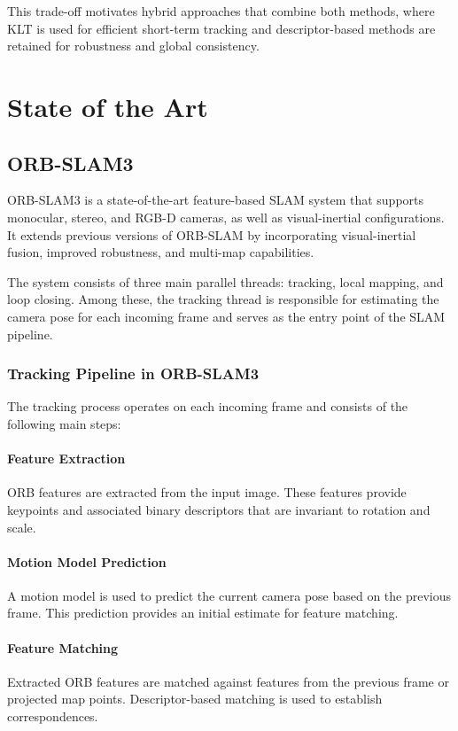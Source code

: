 \documentclass[english, cd=nocolor, cdfont=off, fontsize=11pt]{tudscrreprt}
\begin{document}
This trade-off motivates hybrid approaches that combine both methods, where KLT is used for efficient short-term tracking and descriptor-based methods are retained for robustness and global consistency.

\section{State of the Art}

\subsection{ORB-SLAM3}

ORB-SLAM3 is a state-of-the-art feature-based SLAM system that supports monocular, stereo, and RGB-D cameras, as well as visual-inertial configurations. It extends previous versions of ORB-SLAM by incorporating visual-inertial fusion, improved robustness, and multi-map capabilities.

The system consists of three main parallel threads: tracking, local mapping, and loop closing. Among these, the tracking thread is responsible for estimating the camera pose for each incoming frame and serves as the entry point of the SLAM pipeline.

\subsubsection{Tracking Pipeline in ORB-SLAM3}

The tracking process operates on each incoming frame and consists of the following main steps:

\paragraph{Feature Extraction}
ORB features are extracted from the input image. These features provide keypoints and associated binary descriptors that are invariant to rotation and scale.

\paragraph{Motion Model Prediction}
A motion model is used to predict the current camera pose based on the previous frame. This prediction provides an initial estimate for feature matching.

\paragraph{Feature Matching}
Extracted ORB features are matched against features from the previous frame or projected map points. Descriptor-based matching is used to establish correspondences.
\end{document}
